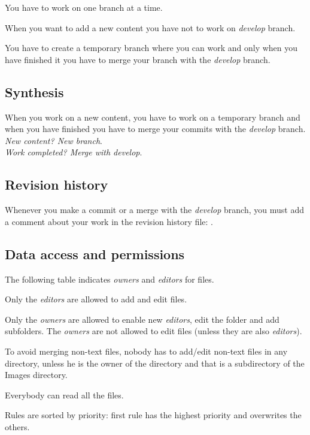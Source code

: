 \documentclass[12pt]{article}
\begin{document}
You have to work on one branch at a time.

When you want to add a new content you have not to work on \textit{develop} branch.

You have to create a temporary branch where you can work and only when you have finished it you have to merge your branch with the \textit{develop} branch.


\subsection*{Synthesis}
When you work on a new content, you have to work on a temporary branch and when you have finished you have to merge your commits with the \textit{develop} branch.\\
\textit{New content? New branch}.\\
\textit{Work completed? Merge with develop}.\\

\subsection*{Revision history}
Whenever you make a commit or a merge with the \textit{develop} branch, you must add a comment about your work in the revision history file: .

\subsection{Data access and permissions}
The following table indicates \textit{owners} and \textit{editors} for files.

Only the \textit{editors} are allowed to add and edit files.

Only the \textit{owners} are allowed to enable new \textit{editors}, edit the folder and add subfolders. The \textit{owners} are not allowed to edit files (unless they are also \textit{editors}).

To avoid merging non-text files, nobody has to add/edit non-text files in any directory, unless he is the owner of the directory and that is a subdirectory of the Images directory. 

Everybody can read all the files.

Rules are sorted by priority: first rule has the highest priority and overwrites the others.
\end{document}
